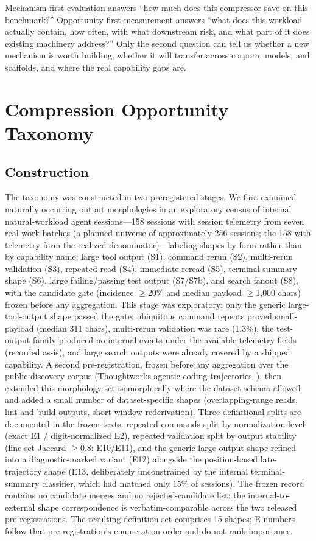﻿\documentclass[sigconf,balance=false]{acmart}
\begin{document}
Mechanism-first evaluation answers ``how much does this compressor save on this benchmark?'' Opportunity-first measurement answers ``what does this workload actually contain, how often, with what downstream risk, and what part of it does existing machinery address?'' Only the second question can tell us whether a new mechanism is worth building, whether it will transfer across corpora, models, and scaffolds, and where the real capability gaps are.

\section{Compression Opportunity Taxonomy}

\subsection{Construction}

The taxonomy was constructed in two preregistered stages. We first examined naturally occurring output morphologies in an exploratory census of internal natural-workload agent sessions---158 sessions with session telemetry from seven real work batches (a planned universe of approximately 256 sessions; the 158 with telemetry form the realized denominator)---labeling shapes by form rather than by capability name: large tool output (S1), command rerun (S2), multi-rerun validation (S3), repeated read (S4), immediate reread (S5), terminal-summary shape (S6), large failing/passing test output (S7/S7b), and search fanout (S8), with the candidate gate (incidence $\geq$20\% and median payload $\geq$1{,}000 chars) frozen before any aggregation. This stage was exploratory: only the generic large-tool-output shape passed the gate; ubiquitous command repeats proved small-payload (median 311 chars), multi-rerun validation was rare (1.3\%), the test-output family produced no internal events under the available telemetry fields (recorded as-is), and large search outputs were already covered by a shipped capability. A second pre-registration, frozen before any aggregation over the public discovery corpus (Thoughtworks agentic-coding-trajectories~\cite{thoughtworks2026}), then extended this morphology set isomorphically where the dataset schema allowed and added a small number of dataset-specific shapes (overlapping-range reads, lint and build outputs, short-window rederivation). Three definitional splits are documented in the frozen texts: repeated commands split by normalization level (exact E1 / digit-normalized E2), repeated validation split by output stability (line-set Jaccard $\geq$0.8: E10/E11), and the generic large-output shape refined into a diagnostic-marked variant (E12) alongside the position-based late-trajectory shape (E13, deliberately unconstrained by the internal terminal-summary classifier, which had matched only 15\% of sessions). The frozen record contains no candidate merges and no rejected-candidate list; the internal-to-external shape correspondence is verbatim-comparable across the two released pre-registrations. The resulting definition set comprises 15 shapes; E-numbers follow that pre-registration's enumeration order and do not rank importance.
\end{document}
